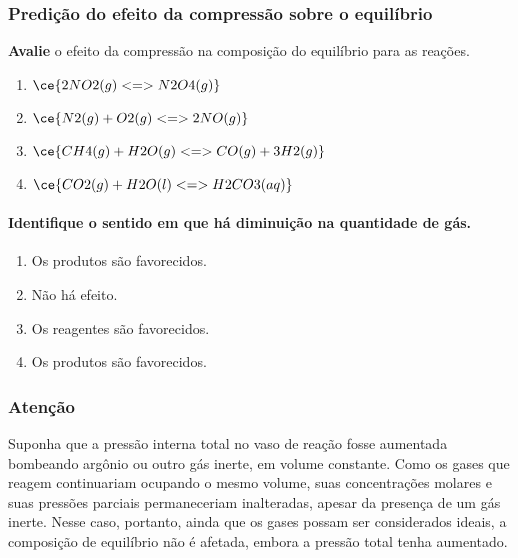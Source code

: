 \begin{example}

\subsubsection{Predição do efeito da compressão sobre o equilíbrio}

\textbf{Avalie} o efeito da compressão na composição do equilíbrio para as reações.

\begin{enumerate}
\def\labelenumi{\alph{enumi}.}
\tightlist
\item
  \(\ce{ 2 NO2(g) <=> N2O4(g) }\)
\item
  \(\ce{ N2(g) + O2(g) <=> 2 NO(g) }\)
\item
  \(\ce{ CH4(g) + H2O(g) <=> CO(g) + 3 H2(g) }\)
\item
  \(\ce{ CO2(g) + H2O(l) <=> H2CO3(aq) }\)
\end{enumerate}

\paragraph{Identifique o sentido em que há diminuição na quantidade de gás.}

\begin{enumerate}
\def\labelenumi{\alph{enumi}.}
\tightlist
\item
  Os produtos são favorecidos.
\item
  Não há efeito.
\item
  Os reagentes são favorecidos.
\item
  Os produtos são favorecidos.
\end{enumerate}

\end{example}

\begin{warning}

\subsubsection{Atenção}

Suponha que a pressão interna total no vaso de reação fosse aumentada bombeando argônio ou outro gás inerte, em volume constante. Como os gases que
reagem continuariam ocupando o mesmo volume, suas concentrações molares e suas pressões parciais permaneceriam inalteradas, apesar da presença de um
gás inerte. Nesse caso, portanto, ainda que os gases possam ser considerados ideais, a composição de equilíbrio não é afetada, embora a pressão total
tenha aumentado.

\end{warning}

